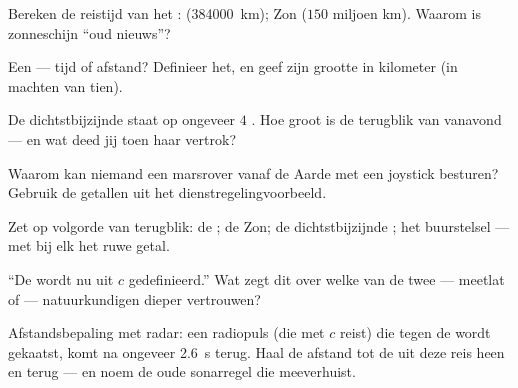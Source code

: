 \begin{exercise}[$\star$]\label{exo:g8:speed-of-light:3}
Bereken de reistijd van het : 
(\qty{384000}{km}); Zon ($150$ miljoen km). Waarom is zonneschijn
``oud nieuws''?
\end{exercise}

\begin{exercise}[$\star$]\label{exo:g8:speed-of-light:4}
Een  --- tijd of afstand? Definieer het, en geef zijn
grootte in kilometer (in machten van tien).
\end{exercise}

\begin{exercise}[$\star$]\label{exo:g8:speed-of-light:5}
De dichtstbijzijnde  staat op ongeveer $4$
. Hoe groot is de terugblik van vanavond --- en wat
deed jij toen haar  vertrok?
\end{exercise}

\begin{exercise}[$\star$]\label{exo:g8:speed-of-light:6}
Waarom kan niemand een marsrover vanaf de Aarde met een joystick
besturen? Gebruik de getallen uit het dienstregelingvoorbeeld.
\end{exercise}

\begin{exercise}[$\star$]\label{exo:g8:speed-of-light:7}
Zet op volgorde van terugblik: de ; de Zon; de
dichtstbijzijnde ; het buurstelsel --- met bij elk het
ruwe getal.
\end{exercise}

\begin{exercise}[$\star$]\label{exo:g8:speed-of-light:8}
``De  wordt nu uit $c$ gedefinieerd.'' Wat zegt dit over
welke van de twee --- meetlat of  --- natuurkundigen
dieper vertrouwen?
\end{exercise}

\begin{exercise}[$\star\star$]\label{exo:g8:speed-of-light:9}
Afstandsbepaling met radar: een radiopuls (die met $c$ reist) die tegen
de  wordt gekaatst, komt na ongeveer \qty{2.6}{s} terug.
Haal de afstand tot de  uit deze reis heen en terug --- en
noem de oude sonarregel die meeverhuist.
\end{exercise}

